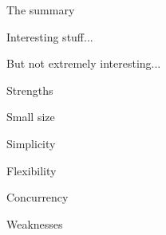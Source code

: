 \begin{frame}
  \begin{center}
    The summary
  \end{center}
\end{frame}

\begin{frame}
  \begin{center}
    Interesting stuff...
  \end{center}
\end{frame}

\begin{frame}
  \begin{center}
    But not extremely interesting...
  \end{center}
\end{frame}

\begin{frame}
  \begin{center}
    Strengths
  \end{center}
\end{frame}

\begin{frame}
  \begin{center}
    Small size
  \end{center}
\end{frame}

\begin{frame}
  \begin{center}
    Simplicity
  \end{center}
\end{frame}

\begin{frame}
  \begin{center}
    Flexibility
  \end{center}
\end{frame}

\begin{frame}
  \begin{center}
    Concurrency
  \end{center}
\end{frame}

\begin{frame}
  \begin{center}
    Weaknesses
  \end{center}
\end{frame}

